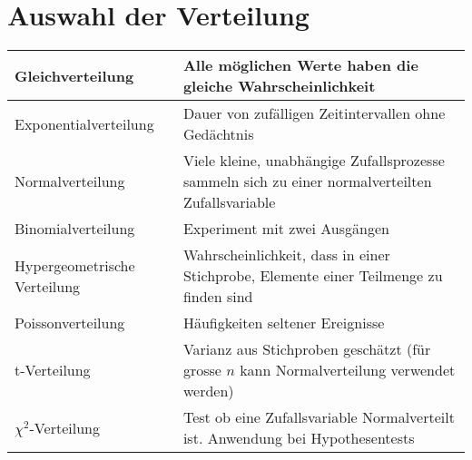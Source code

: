 \section{Auswahl der Verteilung}

	\begin{tabular}{|l|p{12cm}|}
	\hline
		Gleichverteilung &
			Alle möglichen Werte haben die gleiche Wahrscheinlichkeit \\
	\hline	
		Exponentialverteilung &
			Dauer von zufälligen Zeitintervallen ohne Gedächtnis \\
	\hline
		Normalverteilung &
			Viele kleine, unabhängige Zufallsprozesse sammeln sich zu einer normalverteilten Zufallsvariable \\
	\hline			
		Binomialverteilung &
			Experiment mit zwei Ausgängen \\
	\hline			
		Hypergeometrische Verteilung &
			Wahrscheinlichkeit, dass in einer Stichprobe, Elemente einer Teilmenge zu finden sind \\
	\hline	
		Poissonverteilung &
			Häufigkeiten seltener Ereignisse \\
	\hline
		t-Verteilung &
			Varianz aus Stichproben geschätzt (für grosse $n$ kann Normalverteilung verwendet werden)\\
	\hline
		$\chi^2$-Verteilung &
			Test ob eine Zufallsvariable Normalverteilt ist. Anwendung bei Hypothesentests\\
	\hline
	\end{tabular}